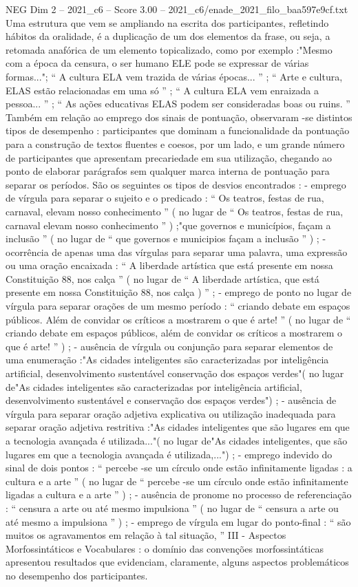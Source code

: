 \begin{textsample}{NEG Dim 2 – 2021\_c6 – Score 3.00 – 2021\_c6/enade\_2021\_filo\_baa597e9cf.txt}
Uma estrutura que vem se ampliando na escrita dos participantes, refletindo hábitos da oralidade, é a duplicação de um dos elementos da frase, ou seja, a retomada anafórica de um elemento topicalizado, como por exemplo :"Mesmo com a época da censura, o ser humano ELE pode se expressar de várias formas..."; “ A cultura ELA vem trazida de várias épocas... ” ; “ Arte e cultura, ELAS estão relacionadas em uma só ” ; “ A cultura ELA vem enraizada a pessoa... ” ; “ As ações educativas ELAS podem ser consideradas boas ou ruins. ” Também em relação ao emprego dos sinais de pontuação, observaram -se distintos tipos de desempenho : participantes que dominam a funcionalidade da pontuação para a construção de textos fluentes e coesos, por um lado, e um grande número de participantes que apresentam precariedade em sua utilização, chegando ao ponto de elaborar parágrafos sem qualquer marca interna de pontuação para separar os períodos.
São os seguintes os tipos de desvios encontrados : - emprego de vírgula para separar o sujeito e o predicado : “ Os teatros, festas de rua, carnaval, elevam nosso conhecimento ” ( no lugar de “ Os teatros, festas de rua, carnaval elevam nosso conhecimento ” ) ;"que governos e municípios, façam a inclusão ” ( no lugar de “ que governos e municipios façam a inclusão ” ) ; - ocorrência de apenas uma das vírgulas para separar uma palavra, uma expressão ou uma oração encaixada : “ A liberdade artística que está presente em nossa Constituição 88, nos calça ” ( no lugar de “ A liberdade artística, que está presente em nossa Constituição 88, nos calça ) ” ; - emprego de ponto no lugar de vírgula para separar orações de um mesmo período : “ criando debate em espaços públicos.
Além de convidar os críticos a mostrarem o que é arte! ” ( no lugar de “ criando debate em espaços públicos, além de convidar os críticos a mostrarem o que é arte! ” ) ; - ausência de vírgula ou conjunção para separar elementos de uma enumeração :"As cidades inteligentes são caracterizadas por inteligência artificial, desenvolvimento sustentável conservação dos espaços verdes"( no lugar de"As cidades inteligentes são caracterizadas por inteligência artificial, desenvolvimento sustentável e conservação dos espaços verdes") ; - ausência de vírgula para separar oração adjetiva explicativa ou utilização inadequada para separar oração adjetiva restritiva :"As cidades inteligentes que são lugares em que a tecnologia avançada é utilizada..."( no lugar de"As cidades inteligentes, que são lugares em que a tecnologia avançada é utilizada,...") ; - emprego indevido do sinal de dois pontos : “ percebe -se um círculo onde estão infinitamente ligadas : a cultura e a arte ” ( no lugar de “ percebe -se um círculo onde estão infinitamente ligadas a cultura e a arte ” ) ; - ausência de pronome no processo de referenciação : “ censura a arte ou até mesmo impulsiona ” ( no lugar de “ censura a arte ou até mesmo a impulsiona ” ) ; - emprego de vírgula em lugar do ponto-final : “ são muitos os agravamentos em relação à tal situação, ” III - Aspectos Morfossintáticos e Vocabulares : o domínio das convenções morfossintáticas apresentou resultados que evidenciam, claramente, alguns aspectos problemáticos no desempenho dos participantes.

\end{textsample}
